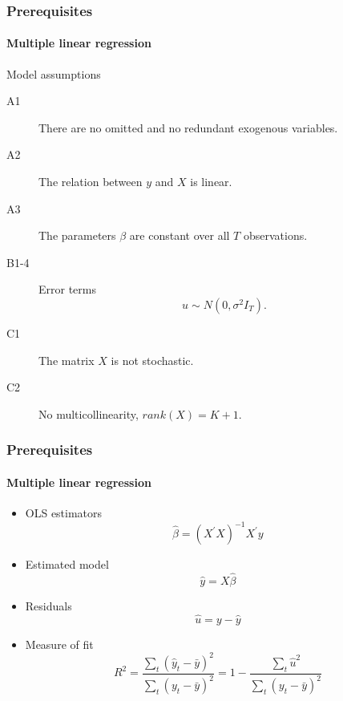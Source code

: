 \documentclass[notes=show]{beamer}
\begin{document}
\begin{frame}\frametitle{Prerequisites}\framesubtitle{Multiple linear regression}
Model assumptions
\begin{description}
    \item[A1] There are no omitted and no redundant exogenous variables.
    \item[A2] The relation between $y$ and $X$ is linear.
    \item[A3] The parameters $\beta $ are constant over all $T$ observations.
    \item[B1-4] Error terms
    \begin{equation*}
        u\sim N\left( 0,\sigma ^{2}I_{T}\right) .
    \end{equation*}
    \item[C1] The matrix $X$ is not stochastic.
    \item[C2] No multicollinearity, $rank(X)=K+1.$
\end{description}
\end{frame}


\begin{frame}\frametitle{Prerequisites}\framesubtitle{Multiple linear regression}
\begin{itemize}
    \item OLS estimators
    \begin{equation*}
    \hat{\beta}=\left( X^{\prime }X\right) ^{-1}X^{\prime }y
    \end{equation*}
\item Estimated model
    \begin{equation*}
        \hat{y}=X\hat{\beta}
    \end{equation*}
\item Residuals
    \begin{equation*}
        \hat{u}=y-\hat{y}
    \end{equation*}
\item Measure of fit
    \begin{equation*}
        R^{2}=\frac{\sum_{t}\left( \hat{y}_{t}-\bar{y}\right) ^{2}}{\sum_{t}\left(    y_{t}-\bar{y}\right) ^{2}}=1-\frac{\sum_{t}\hat{u}^{2}}{\sum_{t}\left( y_{t}-    \bar{y}\right) ^{2}}
    \end{equation*}
\end{itemize}
\end{frame}
\end{document}
